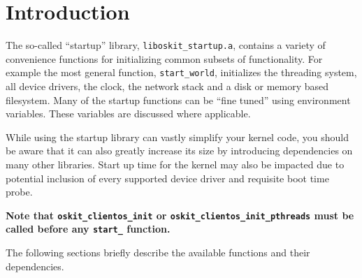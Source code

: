 %
% 
%
\label{startup}

\section{Introduction}

The so-called ``startup'' library, \texttt{liboskit_startup.a},
contains a variety of convenience functions for initializing common
subsets of \oskit{} functionality.
For example the most general function, \texttt{start_world},
initializes the threading system, all device drivers, the clock,
the network stack and a disk or memory based filesystem.
Many of the startup functions can be ``fine tuned'' using environment
variables.  These variables are discussed where applicable.

While using the startup library can vastly simplify your kernel code,
you should be aware that it can also greatly increase its size by introducing
dependencies on many other \oskit{} libraries.
Start up time for the kernel may also be impacted due to potential inclusion
of every supported device driver and requisite boot time probe.

{\bf
Note that \texttt{oskit_clientos_init} or \texttt{oskit_clientos_init_pthreads}
must be called before any \texttt{start_} function.
}

The following sections briefly describe the available functions and their
dependencies.


